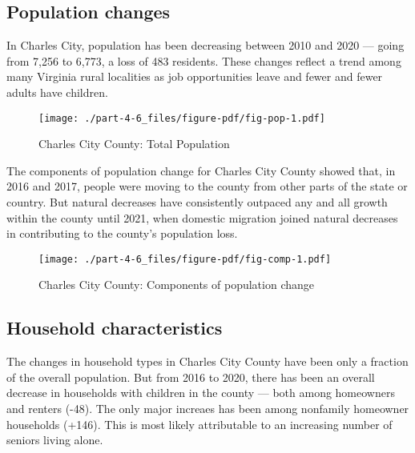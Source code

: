 \documentclass[
  letterpaper,
  DIV=11,
  numbers=noendperiod]{scrreprt}
\begin{document}
\hypertarget{population-changes-5}{%
\subsection{Population changes}\label{population-changes-5}}

In Charles City, population has been decreasing between 2010 and 2020
--- going from 7,256 to 6,773, a loss of 483 residents. These changes
reflect a trend among many Virginia rural localities as job
opportunities leave and fewer and fewer adults have children.

\begin{figure}

{\centering \texttt{[image: ./part-4-6\_files/figure-pdf/fig-pop-1.pdf]}

}

\caption{\label{fig-pop}Charles City County: Total Population}

\end{figure}

The components of population change for Charles City County showed that,
in 2016 and 2017, people were moving to the county from other parts of
the state or country. But natural decreases have consistently outpaced
any and all growth within the county until 2021, when domestic migration
joined natural decreases in contributing to the county's population
loss.

\begin{figure}

{\centering \texttt{[image: ./part-4-6\_files/figure-pdf/fig-comp-1.pdf]}

}

\caption{\label{fig-comp}Charles City County: Components of population
change}

\end{figure}

\hypertarget{household-characteristics-5}{%
\subsection{Household
characteristics}\label{household-characteristics-5}}

The changes in household types in Charles City County have been only a
fraction of the overall population. But from 2016 to 2020, there has
been an overall decrease in households with children in the county ---
both among homeowners and renters (-48). The only major increaes has
been among nonfamily homeowner households (+146). This is most likely
attributable to an increasing number of seniors living alone.
\end{document}
